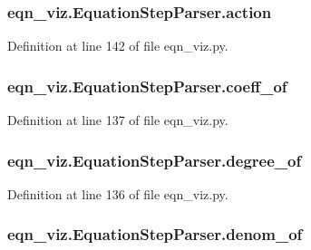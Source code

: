 \subsubsection[{action}]{\setlength{\rightskip}{0pt plus 5cm}eqn\+\_\+viz.\+Equation\+Step\+Parser.\+action}\label{classeqn__viz_1_1_equation_step_parser_aaed9539571b1f81f12baccf92f11dd0b}


Definition at line 142 of file eqn\+\_\+viz.\+py.

\hypertarget{classeqn__viz_1_1_equation_step_parser_a4b9eb7c97b3266f4f87a7c545dc872f6}{}
\subsubsection[{coeff\+\_\+of}]{\setlength{\rightskip}{0pt plus 5cm}eqn\+\_\+viz.\+Equation\+Step\+Parser.\+coeff\+\_\+of}\label{classeqn__viz_1_1_equation_step_parser_a4b9eb7c97b3266f4f87a7c545dc872f6}


Definition at line 137 of file eqn\+\_\+viz.\+py.

\hypertarget{classeqn__viz_1_1_equation_step_parser_af057f41fb578e2d24e016b20673e713b}{}
\subsubsection[{degree\+\_\+of}]{\setlength{\rightskip}{0pt plus 5cm}eqn\+\_\+viz.\+Equation\+Step\+Parser.\+degree\+\_\+of}\label{classeqn__viz_1_1_equation_step_parser_af057f41fb578e2d24e016b20673e713b}


Definition at line 136 of file eqn\+\_\+viz.\+py.

\hypertarget{classeqn__viz_1_1_equation_step_parser_a4d55f5976bf9cd223d905f410a17beef}{}
\subsubsection[{denom\+\_\+of}]{\setlength{\rightskip}{0pt plus 5cm}eqn\+\_\+viz.\+Equation\+Step\+Parser.\+denom\+\_\+of}\label{classeqn__viz_1_1_equation_step_parser_a4d55f5976bf9cd223d905f410a17beef}


